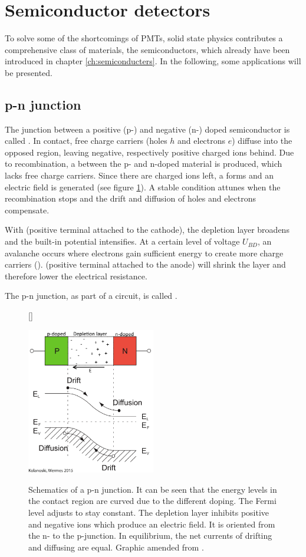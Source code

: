\section{Semiconductor detectors}
To solve some of the shortcomings of PMTs, solid state physics contributes a comprehensive class of materials, the semiconductors, which already have been introduced in chapter \ref{ch:semiconducters}. In the following, some applications will be presented.
\subsection{p-n junction}
The junction between a positive (p-) and negative (n-) doped semiconductor is called . In contact, free charge carriers (holes $h$ and electrons $e$) diffuse into the opposed region, leaving negative, respectively positive charged ions behind. Due to recombination, a  between the p- and n-doped material is produced, which lacks free charge carriers. Since there are charged ions left, a  forms and an electric field is generated (see figure \ref{fig:ch3:pn}). A stable condition attunes when the recombination stops and the drift and diffusion of holes and electrons compensate.   \par 
With  (positive terminal attached to the cathode), the depletion layer broadens and the built-in potential intensifies. At a certain level of voltage $U_{BD}$, an avalanche occurs where electrons gain sufficient energy to create more charge carriers ().   (positive terminal attached to the anode) will shrink the layer and therefore lower the electrical resistance.   \par 
The p-n junction, as part of a circuit, is called . 
\begin{figure}[h!]
	[\FBwidth]
	{\caption[p-n junction]{Schematics of a p-n junction. It can be seen that the energy levels in the contact region are curved due to the different doping. The Fermi level adjusts to stay constant. The depletion layer inhibits positive and negative ions which produce an electric field. It is oriented from the n- to the p-junction. In equilibrium, the net currents of drifting and diffusing are equal.  Graphic amended from \cite{wermes}.}   
		\label{fig:ch3:pn}}
	{\includegraphics[width=0.5\textwidth]{./graphics/ch3/pn.png}}
\end{figure}

